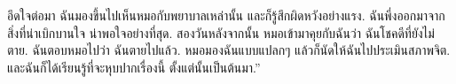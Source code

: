 {\begin{shaded}
		อึดใจต่อมา ฉันมองขึ้นไปเห็นหมอกับพยาบาลเหล่านั้น
		และก็รู้สึกผิดหวังอย่างแรง.
		ฉันพึ่งออกมาจากสิ่งที่น่าเบิกบานใจ น่าพอใจอย่างที่สุด.
		สองวันหลังจากนั้น หมอเข้ามาคุยกับฉันว่า ฉันโชคดีที่ยังไม่ตาย.
		ฉันตอบหมอไปว่า ฉันตายไปแล้ว.
		หมอมองฉันแบบแปลกๆ แล้วก็นัดให้ฉันไปประเมินสภาพจิต.
		และฉันก็ได้เรียนรู้ที่จะหุบปากเรื่องนี้ ตั้งแต่นั้นเป็นต้นมา.''
		\\
		
		
		
		
		
		
		
		
		
		
		

\end{shaded}}
